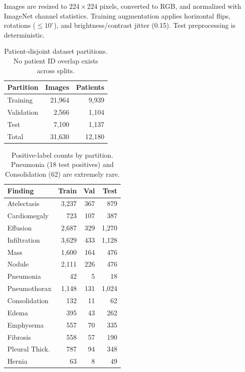 \documentclass[runningheads,a4paper]{llncs}
\begin{document}
Images are resized to $224\!\times\!224$ pixels, converted to RGB, and normalized with ImageNet channel statistics.
Training augmentation applies horizontal flips, rotations ($\leq\!10^\circ$), and brightness/contrast jitter (0.15).
Test preprocessing is deterministic.

\begin{table}[t]
\caption{Patient-disjoint dataset partitions. No patient ID overlap exists across splits.}
\label{tab:split}
\centering\small
\begin{tabular}{lrr}
\toprule
Partition & Images & Patients\\
\midrule
Training & 21{,}964 & 9{,}939\\
Validation & 2{,}566 & 1{,}104\\
Test & 7{,}100 & 1{,}137\\
\midrule
Total & 31{,}630 & 12{,}180\\
\bottomrule
\end{tabular}
\end{table}

\begin{table}[t]
\caption{Positive-label counts by partition. Pneumonia (18 test positives) and Consolidation (62) are extremely rare.}
\label{tab:prevalence}
\centering\small
\begin{tabular}{lrrr}
\toprule
Finding & Train & Val & Test\\
\midrule
Atelectasis & 3{,}237 & 367 & 879\\
Cardiomegaly & 723 & 107 & 387\\
Effusion & 2{,}687 & 329 & 1{,}270\\
Infiltration & 3{,}629 & 433 & 1{,}128\\
Mass & 1{,}600 & 164 & 476\\
Nodule & 2{,}111 & 226 & 476\\
Pneumonia & 42 & 5 & 18\\
Pneumothorax & 1{,}148 & 131 & 1{,}024\\
Consolidation & 132 & 11 & 62\\
Edema & 395 & 43 & 262\\
Emphysema & 557 & 70 & 335\\
Fibrosis & 558 & 57 & 190\\
Pleural Thick. & 787 & 94 & 348\\
Hernia & 63 & 8 & 49\\
\bottomrule
\end{tabular}
\end{table}
\end{document}
